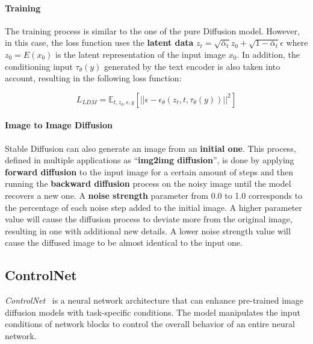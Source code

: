 \documentclass[preprint]{elsarticle}
\begin{document}
\paragraph{Training}

The training process is similar to the one of the pure Diffusion model.
However, in this case, the loss function uses the \textbf{latent data} $z_t=\sqrt{\bar{\alpha}_t}z_0 + \sqrt{1-\bar{\alpha}_t}\epsilon$ where $z_0 = E(x_0)$ is the latent representation of the input image $x_0$. In addition, the conditioning input $\tau_\theta(y)$ generated by the text encoder is also taken into account, resulting in the following loss function:

\begin{equation}
	L_{LDM} = \mathbb{E}_{t,z_0,\epsilon,y}\left[||\epsilon-\epsilon_\theta(z_t,t,\tau_\theta(y))||^2\right]
\end{equation}



\paragraph{Image to Image Diffusion}

Stable Diffusion can also generate an image from an \textbf{initial one}. This process, defined in multiple applications  as ``\textbf{img2img diffusion}'', is done by applying \textbf{forward diffusion} to the input image for a certain amount of steps and then running the \textbf{backward diffusion} process on the noisy image until the model recovers a new one. A \textbf{noise strength} parameter  from 0.0 to 1.0 corresponds to the percentage of each noise step added to the initial image. 
A higher parameter value will cause the diffusion process to deviate more from the original image, resulting in one with additional new details. A lower noise strength value will cause the diffused image to be almost identical to the input one.



\subsection{ControlNet}\label{sect:controlnet}

\emph{ControlNet}~\cite{zhang2023adding} is a neural network architecture that can enhance  pre-trained image diffusion models with task-specific conditions.  The model manipulates the input conditions of network blocks to control the overall behavior of an entire neural network.
\end{document}
